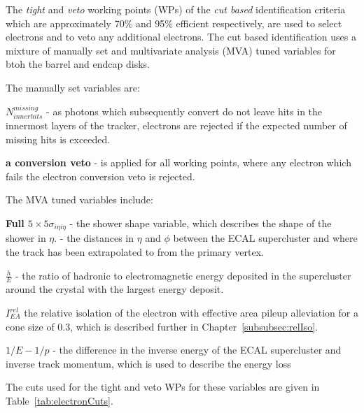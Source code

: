 The \emph{tight} and \emph{veto} working points (WPs) of the \emph{cut based} identification criteria which are approximately  70\% and 95\% efficient respectively, are used to select electrons and to veto any additional electrons.
The cut based identification uses a mixture of manually set and multivariate analysis (MVA) tuned variables for btoh the barrel and endcap disks.

The manually set variables are:
\item \textbf{$N^{missing}_{inner hits}$} - as photons which subsequently convert do not leave hits in the innermost layers of the tracker, electrons are rejected if the expected number of missing hits is exceeded.
\item \textbf{a conversion veto} - is applied for all working points, where any electron which fails the electron conversion veto is rejected.

The MVA tuned variables include:
\item \textbf{Full $5\times5 \sigma_{i\eta i\eta}$} - the shower shape variable, which describes the shape of the shower in $\eta$.
\iten {} - the distances in $\eta$ and $\phi$ between the ECAL supercluster and where the track has been extrapolated to from the primary vertex.
\item \textbf{$\frac{h}{E}$} - the ratio of hadronic to electromagnetic energy deposited in the supercluster around the crystal with the largest energy deposit.
\item \textbf{$I^{rel}_{EA}$} the relative isolation of the electron with effective area pileup alleviation for a cone size of 0.3, which is described further in Chapter~\ref{subsubsec:relIso}.
\item \textbf{$1/E - 1/p$} - the difference in the inverse energy of the ECAL supercluster and inverse track momentum, which is used to describe the energy loss 

The cuts used for the tight and veto WPs for these variables are given in Table~\ref{tab:electronCuts}.

